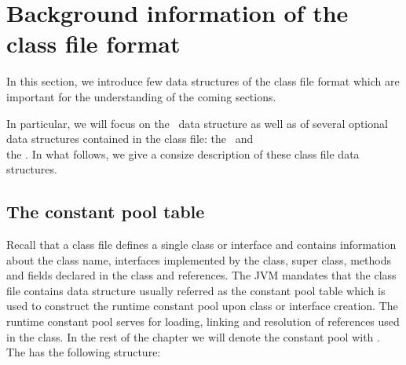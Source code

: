 \newcommand{\cpLength}{\mbox{\rm\textsf{cpLength}}}
\newcommand{\cpElems}{\mbox{\rm\textsf{cpElems}}}
\newcommand{\classConst}{\mbox{\rm\textbf{cpConst}}}


\section{Background information of the class file format}
In this section,  we introduce few data structures of the class file format which are important
for the understanding of the coming sections.



 In particular, we will focus on the 
 \constantPool \ data structure as well as of several optional data structures
 contained in the  class file: the \localVariableTable \ and \\
the \lineNumberTable. 
In what follows, we give a consize description of these class file data structures. 


\subsection{The constant pool table}
 Recall that a class file defines
a single class or interface and contains information about  the class name, interfaces implemented by the class, super class, methods
 and fields declared in the class and references. The JVM  \cite{VMSpec} mandates that the class
 file contains data structure usually referred as the constant pool table  which is used to construct the runtime constant pool upon class or 
interface creation. The runtime constant pool serves for loading, linking and resolution of references used in the class.
In the rest of the chapter we will denote the constant pool with \constantPool.
The \constantPool has the following structure:

